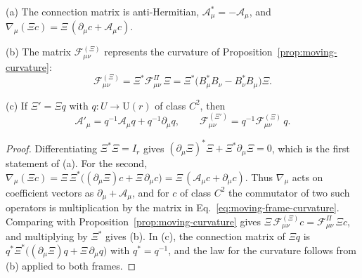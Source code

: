 \begin{proposition}
\label{prop:moving-frame}
\textup{(a)} The connection matrix is anti-Hermitian, $\mathcal A_\mu^*=-\mathcal A_\mu$, and $\nabla_\mu(\Xi c)=\Xi\,(\partial_\mu c+\mathcal A_\mu c)$.

\textup{(b)} The matrix $\mathcal F^{(\Xi)}_{\mu\nu}$ represents the curvature of Proposition~\ref{prop:moving-curvature}:
\begin{equation}
 \mathcal F^{(\Xi)}_{\mu\nu}=\Xi^*\mathcal F^\Pi_{\mu\nu}\,\Xi=\Xi^*\bigl(B_\mu^*B_\nu-B_\nu^*B_\mu\bigr)\Xi .
 \label{eq:moving-frame-covariance}
\end{equation}

\textup{(c)} If $\Xi'=\Xi q$ with $q:U\to\mathrm U(r)$ of class $C^2$, then
\begin{equation}
 \mathcal A'_\mu=q^{-1}\mathcal A_\mu q+q^{-1}\partial_\mu q,\qquad
 \mathcal F^{(\Xi')}_{\mu\nu}=q^{-1}\mathcal F^{(\Xi)}_{\mu\nu}\,q .
 \label{eq:moving-change-of-frame}
\end{equation}
\end{proposition}
\begin{proof}
Differentiating $\Xi^*\Xi=I_r$ gives $(\partial_\mu\Xi)^*\Xi+\Xi^*\partial_\mu\Xi=0$, which is the first statement of (a). For the second, $\nabla_\mu(\Xi c)=\Xi\,\Xi^*\bigl((\partial_\mu\Xi)c+\Xi\,\partial_\mu c\bigr)=\Xi\,(\mathcal A_\mu c+\partial_\mu c)$. Thus $\nabla_\mu$ acts on coefficient vectors as $\partial_\mu+\mathcal A_\mu$, and for $c$ of class $C^2$ the commutator of two such operators is multiplication by the matrix in Eq.~\eqref{eq:moving-frame-curvature}. Comparing with Proposition~\ref{prop:moving-curvature} gives $\Xi\,\mathcal F^{(\Xi)}_{\mu\nu}c=\mathcal F^\Pi_{\mu\nu}\,\Xi c$, and multiplying by $\Xi^*$ gives (b). In (c), the connection matrix of $\Xi q$ is $q^*\Xi^*\bigl((\partial_\mu\Xi)q+\Xi\,\partial_\mu q\bigr)$ with $q^*=q^{-1}$, and the law for the curvature follows from (b) applied to both frames.
\end{proof}

